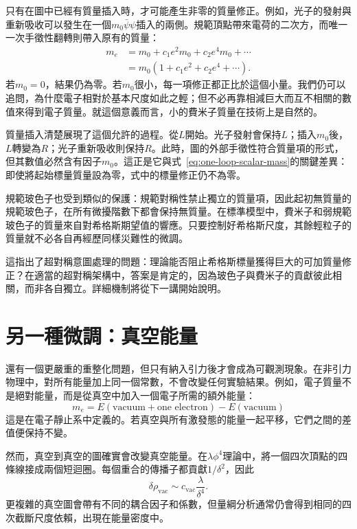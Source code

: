 只有在圖中已經有質量插入時，才可能產生非零的質量修正。例如，光子的發射與重新吸收可以發生在一個\(m_0\bar\psi\psi\)插入的兩側。規範頂點帶來電荷的二次方，而唯一一次手徵性翻轉則帶入原有的質量：
\begin{equation}
\begin{aligned}
m_e
&=m_0+c_1e^2m_0+c_2e^4m_0+\cdots\\
&=m_0\left(1+c_1e^2+c_2e^4+\cdots\right).
\end{aligned}
\label{eq:multiplicative-fermion-mass}
\end{equation}
若\(m_0=0\)，結果仍為零。若\(m_0\)很小，每一項修正都正比於這個小量。我們仍可以追問，為什麼電子相對於基本尺度如此之輕；但不必再靠相減巨大而互不相關的數值來得到電子質量。就這個意義而言，小的費米子質量在技術上是自然的。

質量插入清楚展現了這個允許的過程。從\(L\)開始。光子發射會保持\(L\)；插入\(m_0\)後，\(L\)轉變為\(R\)；光子重新吸收則保持\(R\)。此時，圖的外部手徵性符合質量項的形式，但其數值必然含有因子\(m_0\)。這正是它與式~\eqref{eq:one-loop-scalar-mass}的關鍵差異：即使將起始標量質量設為零，式中的標量修正仍不為零。

規範玻色子也受到類似的保護：規範對稱性禁止獨立的質量項，因此起初無質量的規範玻色子，在所有微擾階數下都會保持無質量。在標準模型中，費米子和弱規範玻色子的質量來自對希格斯期望值的響應。只要控制好希格斯尺度，其餘輕粒子的質量就不必各自再經歷同樣災難性的微調。

這指出了超對稱意圖處理的問題：理論能否阻止希格斯標量獲得巨大的可加質量修正？在適當的超對稱架構中，答案是肯定的，因為玻色子與費米子的貢獻彼此相關，而非各自獨立。詳細機制將從下一講開始說明。

\section{另一種微調：真空能量}

還有一個更嚴重的重整化問題，但只有納入引力後才會成為可觀測現象。在非引力物理中，對所有能量加上同一個常數，不會改變任何實驗結果。例如，電子質量不是絕對能量，而是從真空中加入一個電子所需的額外能量：
\begin{equation}
m_e=E(\text{vacuum}+\text{one electron})-E(\text{vacuum})
\end{equation}
這是在電子靜止系中定義的。若真空與所有激發態的能量一起平移，它們之間的差值便保持不變。

然而，真空到真空的圖確實會改變真空能量。在\(\lambda\phi^4\)理論中，將一個四次頂點的四條線接成兩個短迴圈。每個重合的傳播子都貢獻\(1/\delta^2\)，因此
\begin{equation}
\delta\rho_{\mathrm{vac}}
\sim
c_{\mathrm{vac}}\frac{\lambda}{\delta^4}.
\label{eq:vacuum-energy-divergence}
\end{equation}
更複雜的真空圖會帶有不同的耦合因子和係數，但量綱分析通常仍會得到相同的四次截斷尺度依賴，出現在能量密度中。

